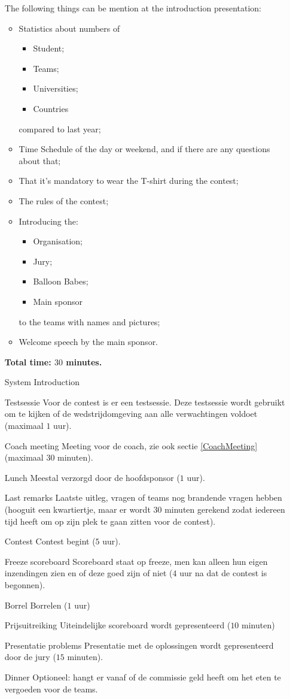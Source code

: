 \begin{itemize}
The following things can be mention at the introduction presentation:
\begin{itemize}
\item Statistics about numbers of
	\begin{itemize}
	\item Student;
	\item Teams;
	\item Universities;
	\item Countries
	\end{itemize}
compared to last year;
\item Time Schedule of the day or weekend, and if there are any questions about that;
\item That it's mandatory to wear the T-shirt during the contest;
\item The rules of the contest;
\item Introducing the:
	\begin{itemize}
	\item Organisation;
	\item Jury;
	\item Balloon Babes;
	\item Main sponsor
	\end{itemize}
to the teams with names and pictures;
\item Welcome speech by the main sponsor.
\end{itemize}

\textbf{Total time: $30$ minutes.}

\item[System Introduction] 

\item[Testsessie] Voor de contest is er een testsessie. Deze testsessie wordt gebruikt om te kijken of de wedstrijdomgeving aan alle verwachtingen voldoet (maximaal $1$ uur).
\item[Coach meeting] Meeting voor de coach, zie ook sectie \ref{CoachMeeting} (maximaal $30$ minuten).
\item[Lunch] Meestal verzorgd door de hoofdsponsor ($1$ uur).
\item[Last remarks] Laatste uitleg, vragen of teams nog brandende vragen hebben (hooguit een kwartiertje, maar er wordt $30$ minuten gerekend zodat iedereen tijd heeft om op zijn plek te gaan zitten voor de contest).
\item[Contest] Contest begint ($5$ uur).
\item[Freeze scoreboard] Scoreboard staat op freeze, men kan alleen hun eigen inzendingen zien en of deze goed zijn of niet ($4$ uur na dat de contest is begonnen).
\item[Borrel] Borrelen ($1$ uur)
\item[Prijsuitreiking] Uiteindelijke scoreboard wordt gepresenteerd ($10$ minuten)
\item[Presentatie problems] Presentatie met de oplossingen wordt gepresenteerd door de jury ($15$ minuten).
\item[Dinner] Optioneel: hangt er vanaf of de commissie geld heeft om het eten te vergoeden voor de teams.
\end{itemize}